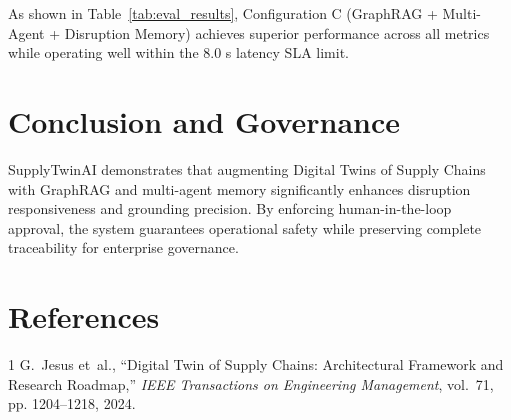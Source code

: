 \documentclass[journal]{IEEEtran}
\begin{document}
As shown in Table~\ref{tab:eval_results}, Configuration C (GraphRAG + Multi-Agent + Disruption Memory) achieves superior performance across all metrics while operating well within the 8.0 s latency SLA limit.

\section{Conclusion and Governance}
SupplyTwinAI demonstrates that augmenting Digital Twins of Supply Chains with GraphRAG and multi-agent memory significantly enhances disruption responsiveness and grounding precision. By enforcing human-in-the-loop approval, the system guarantees operational safety while preserving complete traceability for enterprise governance.

\section*{References}
\begin{thebibliography}{1}
G.~Jesus et~al., ``Digital Twin of Supply Chains: Architectural Framework and Research Roadmap,'' \emph{IEEE Transactions on Engineering Management}, vol.~71, pp. 1204--1218, 2024.
\end{thebibliography}
\end{document}
